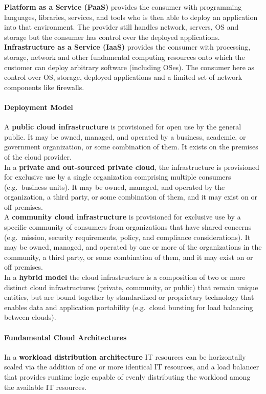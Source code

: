 \textbf{Platform as a Service (PaaS)} provides the consumer with programming languages,
libraries, services, and tools who is then able to deploy an application into that environment.
The provider still handles network, servers, OS and storage but the consumer has control over the deployed applications.\\

\textbf{Infrastructure as a Service (IaaS)} provides the consumer with processing, storage, network and other fundamental computing resources onto which the customer can deploy arbitrary software (including OSes).
The consumer here as control over OS, storage, deployed applications and a limited set of network components like firewalls.

\paragraph{Deployment Model}
A \textbf{public cloud infrastructure} is provisioned for open use by the general public.
It may be owned, managed, and operated by a business, academic, or government organization, or some combination of them.
It exists on the premises of the cloud provider.\\

In a \textbf{private and out-sourced private cloud}, the infrastructure is provisioned for exclusive use by a single organization comprising multiple consumers (e.g.\ business units).
It may be owned, managed, and operated by the organization, a third party, or some combination of them, and it may exist on or off premises.\\

A \textbf{community cloud infrastructure} is provisioned for exclusive use by a specific community of consumers from organizations that have shared concerns (e.g.\ mission, security requirements, policy, and compliance considerations).
It may be owned, managed, and operated by one or more of the organizations in the community, a third party, or some combination of them, and it may exist on or off premises.\\

In a \textbf{hybrid model} the cloud infrastructure is a composition of two or more distinct cloud infrastructures (private, community, or public) that remain unique entities, but are bound together by standardized or proprietary technology that enables data and application portability (e.g.\ cloud bursting for load balancing between clouds).

\paragraph{Fundamental Cloud Architectures}
In a \textbf{workload distribution architecture} IT resources can be horizontally scaled via the addition of one or more identical IT resources, and a load balancer that provides runtime logic capable of evenly distributing the workload among the available IT resources.\\

